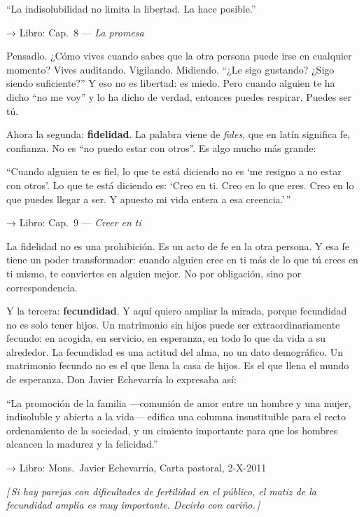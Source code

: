 \documentclass[a4paper, 11pt]{article}
\newcommand{\reflibro}[1]{%
  {\small\sffamily\color{gris} → Libro: #1}%
}
\newcommand{\nota}[1]{%
  \par\smallskip
  {\small\itshape\color{oro!80!black} [\,#1\,]}%
  \par\smallskip
}
\begin{document}
\begin{citalibro}
``La indisolubilidad no limita la libertad. La hace posible.''
\end{citalibro}
\reflibro{Cap.\ 8 — \emph{La promesa}}

Pensadlo. ¿Cómo vives cuando sabes que la otra persona puede irse en cualquier momento? Vives auditando. Vigilando. Midiendo. ``¿Le sigo gustando? ¿Sigo siendo suficiente?'' Y eso no es libertad: es miedo. Pero cuando alguien te ha dicho ``no me voy'' y lo ha dicho de verdad, entonces puedes respirar. Puedes ser tú.

Ahora la segunda: \textbf{fidelidad}. La palabra viene de \emph{fides}, que en latín significa fe, confianza. No es ``no puedo estar con otros''. Es algo mucho más grande:

\begin{citalibro}
``Cuando alguien te es fiel, lo que te está diciendo no es `me resigno a no estar con otros'. Lo que te está diciendo es: `Creo en ti. Creo en lo que eres. Creo en lo que puedes llegar a ser. Y apuesto mi vida entera a esa creencia.'\,''
\end{citalibro}
\reflibro{Cap.\ 9 — \emph{Creer en ti}}

La fidelidad no es una prohibición. Es un acto de fe en la otra persona. Y esa fe tiene un poder transformador: cuando alguien cree en ti más de lo que tú crees en ti mismo, te conviertes en alguien mejor. No por obligación, sino por correspondencia.

Y la tercera: \textbf{fecundidad}. Y aquí quiero ampliar la mirada, porque fecundidad no es solo tener hijos. Un matrimonio sin hijos puede ser extraordinariamente fecundo: en acogida, en servicio, en esperanza, en todo lo que da vida a su alrededor. La fecundidad es una actitud del alma, no un dato demográfico. Un matrimonio fecundo no es el que llena la casa de hijos. Es el que llena el mundo de esperanza. Don Javier Echevarría lo expresaba así:

\begin{citalibro}
``La promoción de la familia ---comunión de amor entre un hombre y una mujer, indisoluble y abierta a la vida--- edifica una columna insustituible para el recto ordenamiento de la sociedad, y un cimiento importante para que los hombres alcancen la madurez y la felicidad.''
\end{citalibro}
\reflibro{Mons.\ Javier Echevarría, Carta pastoral, 2-X-2011}

\nota{Si hay parejas con dificultades de fertilidad en el público, el matiz de la fecundidad amplia es muy importante. Decirlo con cariño.}
\end{document}
